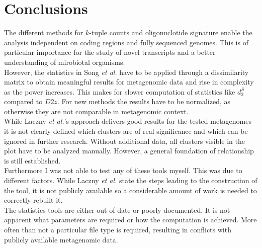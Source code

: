 \documentclass[twocolumn]{bmcart}%
\begin{document}
\section*{Conclusions}
The different methods for $k$-tuple counts and oligonuclotide signature enable the analysis independent on coding regions and fully sequenced genomes. This is of particular importance for the study of novel transcripts and a better understanding of mirobiotal organisms.\\
However, the statistics in Song \textit{et al.} have to be applied through a dissimilarity matrix to obtain meaningful results for metagenomic data and rise in complexity as the power increases. This makes for slower computation of statistics like $d_2^S$ compared to $D2z$. For new methods the results have to be normalized, as otherwise they are not comparable in metagenomic context.\\
While Laczny \textit{et al.}'s approach delivers good results for the tested metagenomes it is not clearly defined which clusters are of real significance and which can be ignored in further research. Without additional data, all clusters visible in the plot have to be analyzed manually. However, a general foundation of relationship is still established.\\
Furthermore I was not able to test any of these tools myself. This was due to different factors. While Laczny \textit{et al.} state the steps leading to the construction of the tool, it is not publicly available so a considerable amount of work is needed to correctly rebuilt it.\\
The statistics-tools are either out of date or poorly documented. It is not apparent what parameters are required or how the computation is achieved. More often than not a particular file type is required, resulting in conflicts with publicly available metagenomic data.
\end{document}
